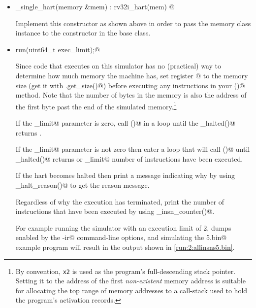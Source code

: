 \documentclass{article}
\begin{document}
\begin{itemize}

\item \verb@cpu_single_hart(memory &mem) : rv32i_hart(mem) {}@

Implement this constructor as shown above in order to pass the memory class 
instance to the constructor in the base class.

\item \verb@void run(uint64_t exec_limit);@

Since code that executes on this simulator has no (practical) way to determine 
how much memory the machine has, set register @ to the memory size (get 
it with \verb@mem.get_size()@) before executing any instructions in your \verb@run()@ 
method. Note that the number of bytes in the memory is also the address of the first 
byte past the end of the simulated memory.\footnote{By convention, {\tt x2}
is used as the program's full-descending stack pointer. Setting it to the 
address of the first {\em non-existent} memory address is suitable for
allocating the top range of memory addresses to a call-stack used to hold 
the program's activation records.}

If the \verb@exec_limit@ parameter is zero, call \verb@tick()@ in a loop
until the \verb@is_halted()@ returns \verb@true@.

If the \verb@exec_limit@ parameter is not zero then enter a loop that will 
call \verb@tick()@ until \verb@is_halted()@ returns \verb@true@ or 
\verb@exec_limit@ number of instructions have been executed.  

If the hart becomes halted then print a message indicating why by using 
\verb@get_halt_reason()@ to get the reason message.

Regardless of why the execution has terminated, print the number of instructions that
have been executed by using \verb@get_insn_counter()@.



For example running the simulator with an execution limit of 2, dumps enabled 
by the \verb@-ir@ command-line options, and simulating the \verb@allinsns5.bin@ 
example program will result in the output shown in \autoref{run:2:allinsns5.bin}.


\end{itemize}
\end{document}
